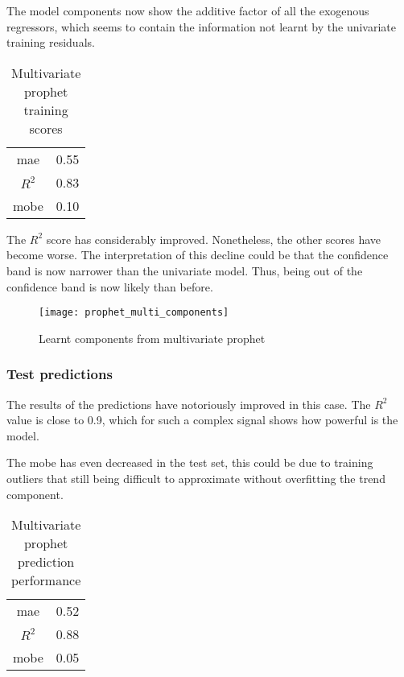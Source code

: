 The model components now show the additive factor of all the exogenous regressors, which seems to contain the information not learnt by the univariate training residuals. 

\begin{table}[H]
	\centering
	\begin{tabular}{|c|c|}
		\hline
		\ac{mae} 	& 0.55 \\
		$R^2$ 		& 0.83 \\
		\ac{mobe} 	& 0.10 \\
		\hline
	\end{tabular}
	\caption{Multivariate prophet training scores}
	\label{table:prophet_multi_train_scores}
\end{table}

The $R^2$ score has considerably improved. Nonetheless, the other scores have become worse. The interpretation of this decline could be that the confidence band is now narrower than the univariate model. Thus, being out of the confidence band is now likely than before.

\begin{figure}[H]
	\centering
	\texttt{[image: prophet\_multi\_components]}
	\caption{Learnt components from multivariate prophet}
	\label{fig:prophet_multi_components}
\end{figure}



\subsubsection*{Test predictions}

The results of the predictions have notoriously improved in this case. The $R^2$ value is close to 0.9, which for such a complex signal shows how powerful is the model. 

The \ac{mobe} has even decreased in the test set, this could be due to training outliers that still being difficult to approximate without overfitting the trend component. 

 
\begin{table}[H]
	\centering
	\begin{tabular}{|c|c|}
		\hline
		\ac{mae} 	& 0.52 \\
		$R^2$ 		& 0.88 \\
		\ac{mobe} 	& 0.05 \\
		\hline
	\end{tabular}
	\caption{Multivariate prophet prediction performance}
	\label{table:prophet_multi_test_scores}
\end{table}



